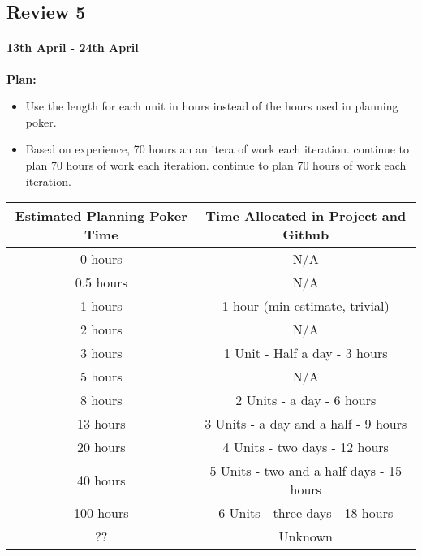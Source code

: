 \subsection{Review 5}
\paragraph{13th April - 24th April}

\textbf{Plan:}
\begin{itemize}
\item Use the length for each unit in hours instead of the hours used in planning poker.
\item Based on experience, 70 hours an an itera of work each iteration. continue to plan 70 hours of work each iteration. continue to plan 70 hours of work each iteration.
\end{itemize}

\begin{table}[h]
\begin{tabular}{|c|c|}
\hline
Estimated Planning Poker Time & Time Allocated in Project and Github     \\ \hline
0 hours                       & N/A                                      \\ \hline
0.5 hours                     & N/A                                      \\ \hline
1 hours                       & 1 hour (min estimate, trivial)           \\ \hline
2 hours                       & N/A                                      \\ \hline
3 hours                       & 1 Unit - Half a day - 3 hours            \\ \hline
5 hours                       & N/A                                      \\ \hline
8 hours                       & 2 Units - a day - 6 hours                \\ \hline
13 hours                      & 3 Units - a day and a half - 9 hours     \\ \hline
20 hours                      & 4 Units - two days - 12 hours            \\ \hline
40 hours                      & 5 Units - two and a half days - 15 hours \\ \hline
100 hours                     & 6 Units - three days - 18 hours          \\ \hline
??                            & Unknown                                  \\ \hline
\end{tabular}
\end{table}

